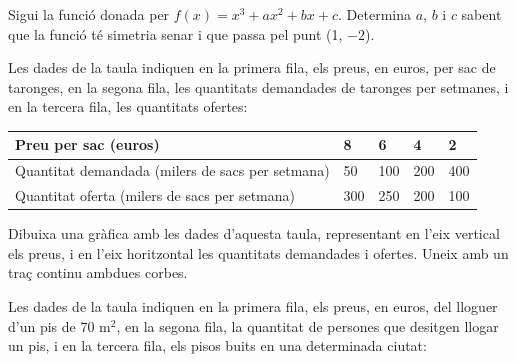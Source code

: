 \begin{mylist}
\answers{Dom $p=\Re$;\par Dom $q=\Re$;\par Dom $r=(-\infty,-1]$;\par Dom $s=\Re$;\par Dom $f=\Re-\{-3\}$;\par Dom $g=\Re-\{0\}$;\par Dom $h=\Re$;\par Dom $j=\Re-\{-2,2\}$ }

\exer Sigui la funció donada per $f\left(x\right)=x^{3} +ax^{2} +bx+c$. Determina $a$, $b$ i $c$ sabent que la funció té simetria senar i que passa pel punt (1, $-2$).


\exer  Les dades de la taula indiquen en la primera fila, els preus, en euros, per sac de taronges, en la segona fila, les quantitats demandades de taronges per setmanes, i en la tercera fila, les quantitats ofertes:

\begin{tabular}{|p{2.4in}|p{0.6in}|p{0.6in}|p{0.6in}|p{0.6in}|} \hline 
	Preu per sac (euros) & 8 & 6 & 4 & 2 \\ \hline 
	Quantitat demandada (milers de sacs per setmana) & 50 & 100 & 200 & 400 \\ \hline 
	Quantitat oferta (milers de sacs per setmana) & 300 & 250 & 200 & 100 \\ \hline 
\end{tabular}

Dibuixa una gràfica amb les dades d'aquesta taula, representant en l'eix vertical els preus, i en l'eix horitzontal les quantitats demandades i ofertes. Uneix amb un traç continu ambdues corbes.


\exer  Les dades de la taula indiquen en la primera fila, els preus, en euros, del lloguer d'un pis de 70 m${}^{2}$, en la segona fila, la quantitat de persones que desitgen llogar un pis, i en la tercera fila, els pisos buits en una determinada ciutat:



\end{mylist}

